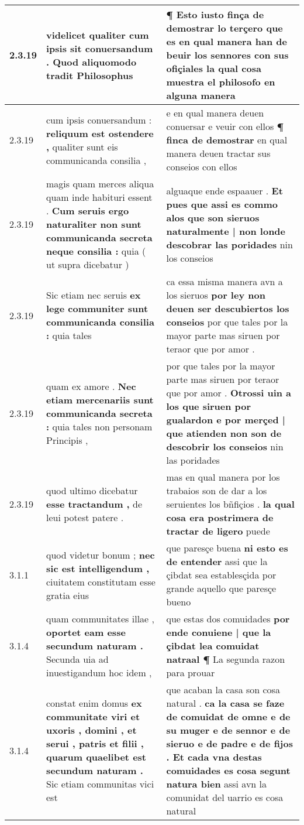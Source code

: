 \begin{tabular}{|p{1cm}|p{6.5cm}|p{6.5cm}|}
2.3.19 & videlicet qualiter \textbf{ cum ipsis sit conuersandum . } Quod aliquomodo tradit Philosophus & ¶ Esto iusto finça de demostrar lo terçero \textbf{ que es en qual manera han de beuir los sennores con sus ofiçiales } la qual cosa muestra el philosofo en alguna manera \\\hline
2.3.19 & cum ipsis conuersandum : \textbf{ reliquum est ostendere , } qualiter sunt eis communicanda consilia , & e en qual manera deuen conuersar e veuir con ellos \textbf{ ¶ finca de demostrar } en qual manera deuen tractar sus conseios con ellos \\\hline
2.3.19 & magis quam merces aliqua quam inde habituri essent . \textbf{ Cum seruis ergo naturaliter non sunt communicanda secreta neque consilia : } quia ( ut supra dicebatur ) & alguaque ende espaauer . \textbf{ Et pues que assi es commo alos que son sieruos naturalmente | non londe descobrar las poridades } nin los conseios \\\hline
2.3.19 & Sic etiam nec seruis \textbf{ ex lege communiter sunt communicanda consilia : } quia tales & ca essa misma manera avn a los sieruos \textbf{ por ley non deuen ser descubiertos los conseios } por que tales por la mayor parte mas siruen por teraor que por amor . \\\hline
2.3.19 & quam ex amore . \textbf{ Nec etiam mercenariis sunt communicanda secreta : } quia tales non personam Principis , & por que tales por la mayor parte mas siruen por teraor que por amor . \textbf{ Otrossi uin a los que siruen por gualardon e por merçed | que atienden non son de descobrir los conseios } nin las poridades \\\hline
2.3.19 & quod ultimo dicebatur \textbf{ esse tractandum , } de leui potest patere . & mas en qual manera por los trabaios son de dar a los seruientes los bñfiçios . \textbf{ la qual cosa era postrimera de tractar de ligero } puede \\\hline
3.1.1 & quod videtur bonum ; \textbf{ nec sic est intelligendum , } ciuitatem constitutam esse gratia eius & que paresçe buena \textbf{ ni esto es de entender } assi que la çibdat sea establesçida por grande aquello que paresçe bueno \\\hline
3.1.4 & quam communitates illae , \textbf{ oportet eam esse secundum naturam . } Secunda uia ad inuestigandum hoc idem , & que estas dos comuidades \textbf{ por ende conuiene | que la çibdat lea comuidat natraal ¶ } La segunda razon para prouar \\\hline
3.1.4 & constat enim domus \textbf{ ex communitate viri et uxoris , domini , et serui , patris et filii , quarum quaelibet est secundum naturam . } Sic etiam communitas vici est & que acaban la casa son cosa natural . \textbf{ ca la casa se faze de comuidat de omne e de su muger e de sennor e de sieruo e de padre e de fijos . Et cada vna destas comuidades es cosa segunt natura bien } assi avn la comunidat del uarrio es cosa natural \\\hline

\end{tabular}

